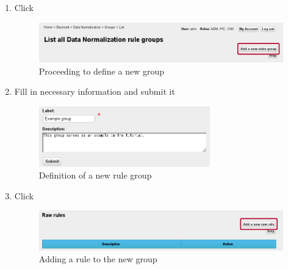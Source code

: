 {\begin{enumerate}[resume]
	\item Click 

\begin{figure}[!ht]
    \centering
    \includegraphics[width=\textwidth]{images/fe-walkthrough-add-group.png}
    \caption{Proceeding to define a new group}
	\label{fig:feWTAddGroup}
\end{figure}
\FloatBarrier

\newpage

\vspace*{0.15\textheight}

	\item Fill in necessary information and submit it

\begin{figure}[!ht]
    \centering
    \includegraphics[width=0.7\textwidth]{images/fe-walkthrough-new-group.png}
    \caption{Definition of a new rule group}
	\label{fig:feWTNewGroup}
\end{figure}
\FloatBarrier

\vspace*{0.2\textheight}

	\item Click 

\begin{figure}[!ht]
    \centering
    \includegraphics[width=\textwidth]{images/fe-walkthrough-add-raw-rule.png}
    \caption{Adding a rule to the new group}
	\label{fig:feWTAddRawRule}
\end{figure}
\FloatBarrier

\newpage

\vspace*{0.15\textheight}


\end{enumerate}}
